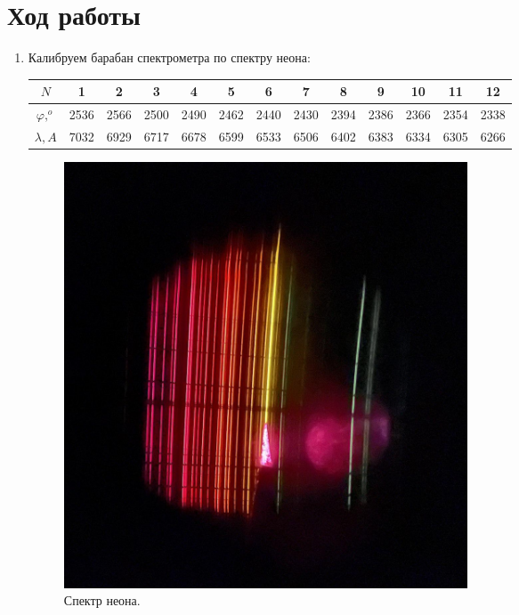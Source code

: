 \documentclass[a4paper,12pt]{article}
\begin{document}
\section{Ход работы} 
  
 
 \begin{enumerate}
\item Калибруем барабан спектрометра по спектру неона:

  \begin{table}[H]
\begin{center}
\begin{tabular}{|c|c|c|c|c|c|c|c|c|c|c|c|c|}
\hline $N $&1 &2&3&4&5&6&7&8&9&10&11&12\\
\hline $\varphi , ^{o}$&2536&2566&2500&2490&2462&2440&2430&2394&2386&2366&2354&2338\\
\hline $\lambda , A$&7032&6929&6717&6678&6599&6533&6506&6402&6383&6334&6305&6266\\
\hline 
\end{tabular}
\end{center}
\end{table}

       \begin{figure}[H]
  \begin{center}
    \includegraphics[width=12cm]{ex3.jpg}
    \caption{Спектр неона.}
    \label{fig:}
  \end{center}
\end{figure}


\end{enumerate}
\end{document}
